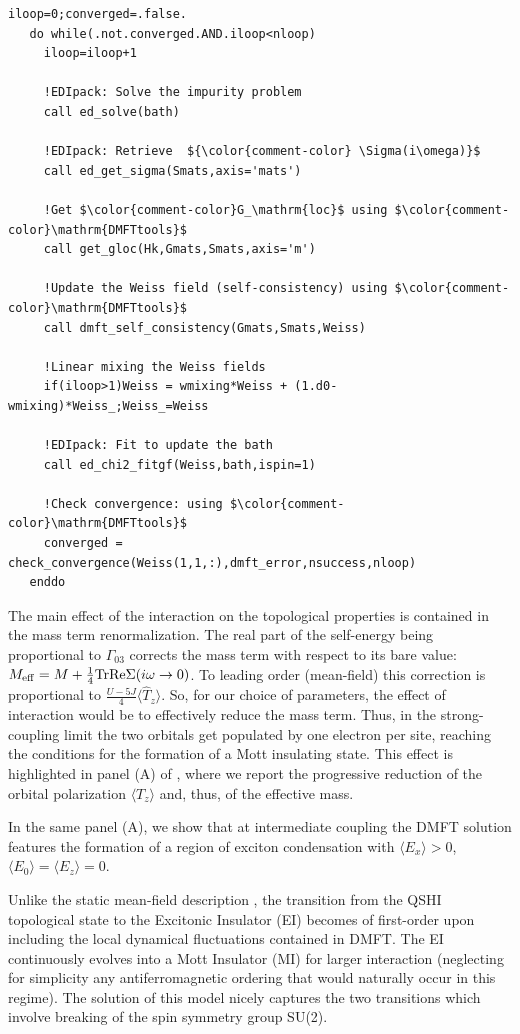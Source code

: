 \documentclass[edipack_sp.tex]{subfiles}
\begin{document}
\begin{lstlisting}[style=fstyle,numbers=none,basicstyle={\scriptsize\ttfamily}]
   iloop=0;converged=.false.
   do while(.not.converged.AND.iloop<nloop)
     iloop=iloop+1
     
     !EDIpack: Solve the impurity problem
     call ed_solve(bath)

     !EDIpack: Retrieve  ${\color{comment-color} \Sigma(i\omega)}$
     call ed_get_sigma(Smats,axis='mats')
     
     !Get $\color{comment-color}G_\mathrm{loc}$ using $\color{comment-color}\mathrm{DMFTtools}$
     call get_gloc(Hk,Gmats,Smats,axis='m')
     
     !Update the Weiss field (self-consistency) using $\color{comment-color}\mathrm{DMFTtools}$
     call dmft_self_consistency(Gmats,Smats,Weiss)

     !Linear mixing the Weiss fields
     if(iloop>1)Weiss = wmixing*Weiss + (1.d0-wmixing)*Weiss_;Weiss_=Weiss

     !EDIpack: Fit to update the bath
     call ed_chi2_fitgf(Weiss,bath,ispin=1)
     
     !Check convergence: using $\color{comment-color}\mathrm{DMFTtools}$
     converged = check_convergence(Weiss(1,1,:),dmft_error,nsuccess,nloop)
   enddo  
\end{lstlisting}

%
The main effect of the interaction on the topological properties is contained in the mass term renormalization.  
The real part of the self-energy being proportional to $\Gamma_{03}$
corrects the mass term with respect to its bare value: $M_\mathrm{eff}=M+\tfrac{1}{4}{\rm Tr}{{\rm Re}\Sigma(i\omega\to0)}$. 
To leading order (mean-field) this correction is proportional to $\tfrac{U-5J}{4}\langle
\hat{T}_z\rangle$. So, for our choice of parameters, the effect of
interaction would be to effectively reduce the mass term. Thus, in the strong-coupling limit the two orbitals get populated by one electron per site, reaching the
conditions for the formation of a Mott insulating state.
This effect is highlighted in panel (A) of , where we report the progressive reduction of the
orbital polarization  $\langle T_z\rangle$ and, thus, of the effective mass. 


In the same panel (A), we show that at intermediate coupling 
the DMFT solution features the formation of a
region of exciton condensation with $\langle E_x\rangle>0$, $\langle
E_0\rangle=\langle E_z\rangle=0$. 

Unlike the static mean-field description \cite{Blason}, the
transition from the QSHI topological state to the Excitonic Insulator 
(EI) becomes of first-order upon including the local dynamical fluctuations \cite{Paoletti2024PR,BellomiaKMH} contained in DMFT. 
The EI continuously evolves into a Mott Insulator (MI)
for larger interaction (neglecting for simplicity any 
antiferromagnetic ordering that would naturally occur in this
regime).
The \NAME solution of this model nicely captures the two transitions which involve breaking of the spin symmetry group SU(2). 
\end{document}
